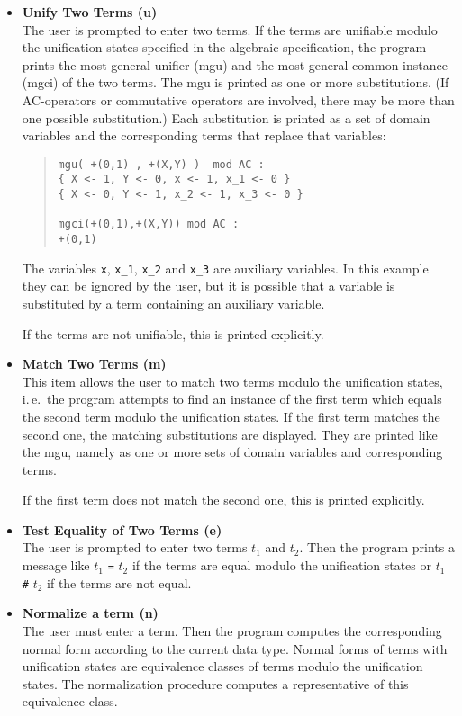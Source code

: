 \begin{itemize}
\item {\bf Unify Two Terms (u)}\\
The user is prompted to enter two terms.
If the terms are unifiable modulo the unification states specified
in the algebraic specification, 
the program prints the most general
unifier (mgu) and the most general common instance (mgci) of the two 
terms. The mgu is printed as one or more substitutions. (If 
AC-operators or commutative operators are involved, there may be more
than one possible
substitution.) Each substitution is printed as a set of domain variables
and the corresponding terms that replace that variables:
\begin{quote}
\begin{verbatim}
mgu( +(0,1) , +(X,Y) )  mod AC :
{ X <- 1, Y <- 0, x <- 1, x_1 <- 0 }
{ X <- 0, Y <- 1, x_2 <- 1, x_3 <- 0 }
 
mgci(+(0,1),+(X,Y)) mod AC :
+(0,1)
\end{verbatim}
\end{quote}
The variables \verb/x/, \verb/x_1/, \verb/x_2/ and \verb/x_3/ are
auxiliary variables. In this example they can be ignored by the user,
but it is possible that a variable is substituted by a term containing 
an auxiliary variable.

If the terms are not unifiable, this is printed explicitly.

\item {\bf Match Two Terms (m)}\\
This item allows the user to match two terms modulo the unification
states, i.\,e.\  the
program attempts to find an instance of the first term which equals the
second term modulo the unification states.
If the first term matches the second one, the matching substitutions
are displayed.  They are printed like the mgu, namely as one or more sets of
domain variables and corresponding terms.

If the first term does not match the second one, this is printed
explicitly.

\item {\bf Test Equality of Two Terms (e)}\\
The user is prompted to enter two terms $t_1$ and $t_2$. Then the program 
prints a message like $t_1$ \verb/=/ $t_2$ if the terms are equal modulo
the unification states or $t_1$ \verb/#/ $t_2$ if the terms are not equal.

\item {\bf Normalize a term (n)}\\
The user must enter a term. Then the program 
computes the corresponding normal form according to the current data 
type.
Normal forms of terms with unification states are equivalence classes
of terms modulo the unification states.
The normalization procedure computes a representative of this
equivalence class.


\end{itemize}
